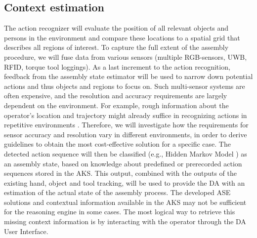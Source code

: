 
\subsection{Context estimation}
The action recognizer will evaluate the position of all relevant objects and persons in the environment and compare these locations to a spatial grid that describes all regions of interest. To capture the full extent of the assembly procedure, we will fuse data from various sensors (multiple RGB-sensors, UWB, RFID, torque tool loggings). As a last increment to the action recognition, feedback from the assembly state estimator will be used to narrow down potential actions and thus objects and regions to focus on. Such multi-sensor systems are often expensive, and the resolution and accuracy requirements are largely dependent on the environment. For example, rough information about the operator's location and trajectory might already suffice in recognizing actions in repetitive environments \cite{bauters2018AutomatedWorkCycle}. Therefore, we will investigate how the requirements for sensor accuracy and resolution vary in different environments, in order to derive guidelines to obtain the most cost-effective solution for a specific case. The detected action sequence will then be classified (e.g., Hidden Markov Model \cite{cramer2018RobustIntentionEstimation}) as an assembly state, based on knowledge about predefined or prerecorded action sequences stored in the AKS. This output, combined with the outputs of the existing hand, object and tool tracking, will be used to provide the DA with an estimation of the actual state of the assembly process. The developed ASE solutions and contextual information available in the AKS may not be sufficient for the reasoning engine in some cases. The most logical way to retrieve this missing context information is by interacting with the operator through the DA User Interface.

